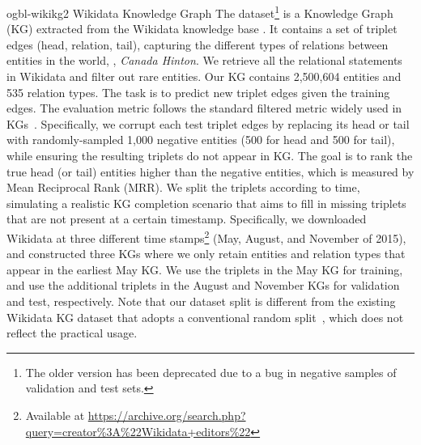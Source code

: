 \dataset
{ogbl-wikikg2}
{Wikidata Knowledge Graph}
{The  dataset\footnote{The older version  has been deprecated due to a bug in negative samples of validation and test sets.} is a Knowledge Graph (KG) extracted from the Wikidata knowledge base \citep{vrandevcic2014wikidata}. It contains a set of triplet edges (\textmd{head}, \textmd{relation}, \textmd{tail}), capturing the different types of relations between entities in the world, \eg, {\it Canada  Hinton}. We retrieve all the relational statements in Wikidata and filter out rare entities. Our KG contains 2,500,604 entities and 535 relation types.}
{The task is to predict new triplet edges given the training edges. The evaluation metric follows the standard filtered metric widely used in KGs~\citep{bordes2013translating,yang2014embedding,trouillon2016complex,sun2019rotate}. Specifically, we corrupt each test triplet edges by replacing its \textmd{head} or \textmd{tail} with randomly-sampled 1,000 negative entities (500 for head and 500 for tail), while ensuring the resulting triplets do not appear in KG. The goal is to rank the true \textmd{head} (or \textmd{tail}) entities higher than the negative entities, which is measured by Mean Reciprocal Rank (MRR).
}
{We split the triplets according to time, simulating a realistic KG completion scenario that aims to fill in missing triplets that are not present at a certain timestamp.
Specifically, we downloaded Wikidata at three different time stamps\footnote{Available at \url{https://archive.org/search.php?query=creator\%3A\%22Wikidata+editors\%22}} (May, August, and November of 2015), and constructed three KGs where we only retain entities and relation types that appear in the earliest May KG.
We use the triplets in the May KG for training, and use the additional triplets in the August and November KGs for validation and test, respectively.
Note that our dataset split is different from the existing Wikidata KG dataset that adopts a conventional random split~\citep{wang2019kepler}, which does not reflect the practical usage.
}
